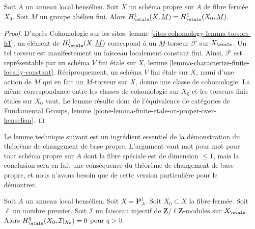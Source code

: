 \begin{lemma}
\label{lemma-proper-over-henselian-and-h1}
Soit $A$ un anneau local hensélien. Soit $X$ un schéma propre sur $A$
de fibre fermée $X_0$. Soit $M$ un groupe abélien fini.
Alors $H^1_\etale(X, \underline{M}) = H^1_\etale(X_0, \underline{M})$.
\end{lemma}

\begin{proof}
D'après Cohomologie sur les sites, lemme \ref{sites-cohomology-lemma-torsors-h1},
un élément de $H^1_\etale(X, \underline{M})$ correspond à un
$\underline{M}$-torseur $\mathcal{F}$ sur $X_\etale$.
Un tel torseur est manifestement un faisceau localement constant fini.
Ainsi, $\mathcal{F}$ est représentable par un schéma $V$ fini
étale sur $X$, lemme \ref{lemma-characterize-finite-locally-constant}.
Réciproquement, un schéma $V$ fini étale sur $X$, muni d'une action de $M$
qui en fait un $M$-torseur sur $X$, donne une classe de cohomologie.
La même correspondance entre les classes de cohomologie sur $X_0$ et les
torseurs finis étales sur $X_0$ vaut.
Le lemme résulte donc de
l'équivalence de catégories de Fundamental Groups, lemme
\ref{pione-lemma-finite-etale-on-proper-over-henselian}.
\end{proof}

\noindent
Le lemme technique suivant est un ingrédient essentiel de la démonstration du
théorème de changement de base propre. L'argument vaut mot pour mot
pour tout schéma propre sur $A$ dont la fibre spéciale est de dimension
$\leq 1$, mais la conclusion sera en fait une conséquence du
théorème de changement de base propre, et nous n'avons besoin que de cette
version particulière pour le démontrer.

\begin{lemma}
\label{lemma-efface-cohomology-on-fibre-by-finite-cover}
Soit $A$ un anneau local hensélien. Soit $X = \mathbf{P}^1_A$.
Soit $X_0 \subset X$ la fibre fermée. Soit $\ell$ un nombre
premier. Soit $\mathcal{I}$ un faisceau injectif de
$\mathbf{Z}/\ell\mathbf{Z}$-modules sur $X_\etale$. Alors
$H^q_\etale(X_0, \mathcal{I}|_{X_0}) = 0$ pour $q > 0$.
\end{lemma}

